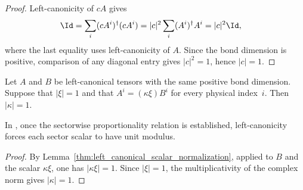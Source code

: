 \begin{proof}\leanok
    Left-canonicity of $cA$ gives
    \begin{align}
        \Id & = \sum_i (cA^i)^\dagger(cA^i) = |c|^2 \sum_i (A^i)^\dagger A^i = |c|^2\Id,
    \end{align}
    where the last equality uses left-canonicity of $A$. Since the bond
    dimension is positive, comparison of any diagonal entry gives $|c|^2=1$,
    hence $|c|=1$.
\end{proof}

\begin{lemma}
    \label{thm:left_canonical_sector_scalar_normalization}
    \leanok
    Let $A$ and $B$ be left-canonical tensors with the same positive bond
    dimension. Suppose that $|\xi|=1$ and that
    $A^i=(\kappa\xi)B^i$ for every physical index~$i$. Then $|\kappa|=1$.

    In \cite[Appendix~A, lines~1082--1084]{DeLasCuevas2017Irreducible}, once
    the sectorwise proportionality relation is established, left-canonicity
    forces each sector scalar to have unit modulus.
\end{lemma}

\begin{proof}\leanok
    By Lemma~\ref{thm:left_canonical_scalar_normalization}, applied to $B$
    and the scalar $\kappa\xi$, one has $|\kappa\xi|=1$. Since $|\xi|=1$, the
    multiplicativity of the complex norm gives $|\kappa|=1$.
\end{proof}

